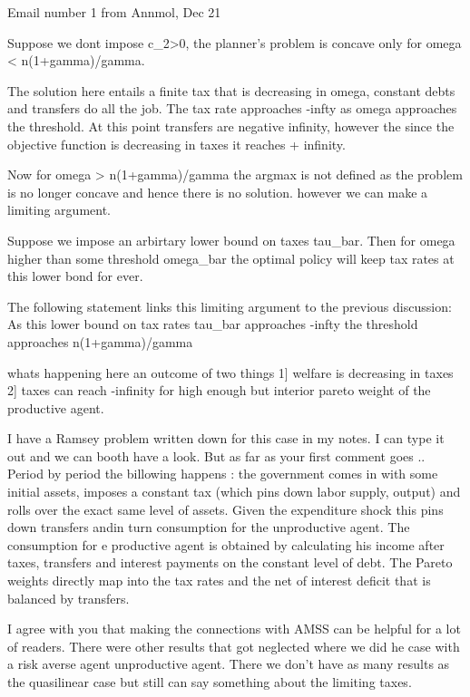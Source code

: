 Email number 1 from Annmol, Dec 21

Suppose we dont impose c_2>0, the planner's problem is concave only for omega < n(1+gamma)/gamma.

The solution here entails  a finite tax that is decreasing in omega, constant debts and transfers do all the job.  The tax rate  approaches -infty as omega approaches the threshold. At this point transfers are negative infinity, however the since the objective function is decreasing in taxes it reaches + infinity.

Now for omega > n(1+gamma)/gamma the argmax is not defined as the problem is no longer concave and hence there is no solution. however we can make a limiting argument.

Suppose we impose an arbirtary lower bound on taxes tau_bar. Then for omega higher than some threshold omega_bar the optimal policy will keep tax rates at this lower bond for ever.

The following statement links this limiting argument to the previous discussion: As this lower bound on tax rates tau_bar approaches -infty the threshold approaches n(1+gamma)/gamma

whats happening here an outcome of two things
1] welfare is decreasing in taxes
2] taxes can reach -infinity for high enough but interior pareto weight of the productive agent.





I have a Ramsey problem written down for this case in my notes. I can type it out and we can booth have a look. But as far as your first comment goes .. Period by period the billowing happens : the government comes in with some initial assets, imposes a constant tax (which pins down labor supply, output) and rolls over the exact same level of assets. Given the expenditure shock this pins down transfers andin turn consumption for the unproductive agent. The consumption for e productive agent is obtained by calculating his income after taxes, transfers and interest payments on the constant level of debt.
The Pareto weights directly map into the tax rates and the net of interest deficit that is balanced by transfers.

I agree with you that making the connections with AMSS can be helpful for a lot of readers. There were other results that got neglected where we did he case with a risk averse agent unproductive agent. There we don't have as many results as the quasilinear case but still can say something about the limiting taxes.


